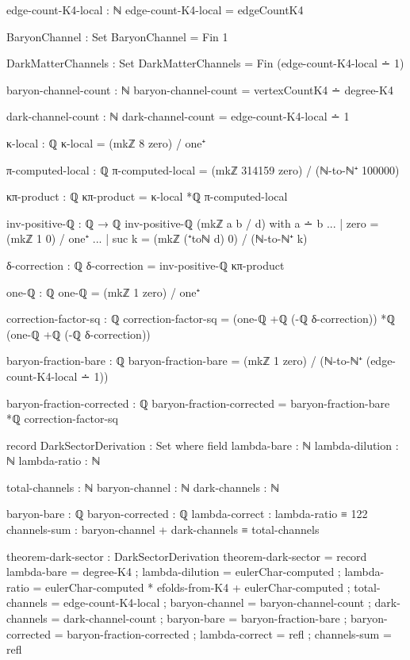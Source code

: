 \documentclass[11pt,a4paper]{book}
\begin{document}
\begin{code}
edge-count-K4-local : ℕ
edge-count-K4-local = edgeCountK4

BaryonChannel : Set
BaryonChannel = Fin 1

DarkMatterChannels : Set
DarkMatterChannels = Fin (edge-count-K4-local ∸ 1)

baryon-channel-count : ℕ
baryon-channel-count = vertexCountK4 ∸ degree-K4

dark-channel-count : ℕ
dark-channel-count = edge-count-K4-local ∸ 1
\end{code}

\begin{code}
κ-local : ℚ
κ-local = (mkℤ 8 zero) / one⁺

π-computed-local : ℚ
π-computed-local = (mkℤ 314159 zero) / (ℕ-to-ℕ⁺ 100000)

κπ-product : ℚ
κπ-product = κ-local *ℚ π-computed-local

inv-positive-ℚ : ℚ → ℚ
inv-positive-ℚ (mkℤ a b / d) with a ∸ b
... | zero = (mkℤ 1 0) / one⁺
... | suc k = (mkℤ (⁺toℕ d) 0) / (ℕ-to-ℕ⁺ k)

δ-correction : ℚ
δ-correction = inv-positive-ℚ κπ-product

one-ℚ : ℚ
one-ℚ = (mkℤ 1 zero) / one⁺

correction-factor-sq : ℚ
correction-factor-sq = (one-ℚ +ℚ (-ℚ δ-correction)) *ℚ (one-ℚ +ℚ (-ℚ δ-correction))

baryon-fraction-bare : ℚ
baryon-fraction-bare = (mkℤ 1 zero) / (ℕ-to-ℕ⁺ (edge-count-K4-local ∸ 1))

baryon-fraction-corrected : ℚ
baryon-fraction-corrected = baryon-fraction-bare *ℚ correction-factor-sq
\end{code}

\begin{code}
record DarkSectorDerivation : Set where
  field
    lambda-bare : ℕ
    lambda-dilution : ℕ
    lambda-ratio : ℕ
    
    total-channels : ℕ
    baryon-channel : ℕ
    dark-channels : ℕ
    
    baryon-bare : ℚ
    baryon-corrected : ℚ
    lambda-correct : lambda-ratio ≡ 122
    channels-sum : baryon-channel + dark-channels ≡ total-channels

theorem-dark-sector : DarkSectorDerivation
theorem-dark-sector = record
  { lambda-bare = degree-K4
  ; lambda-dilution = eulerChar-computed
  ; lambda-ratio = eulerChar-computed * efolds-from-K4 + eulerChar-computed
  ; total-channels = edge-count-K4-local
  ; baryon-channel = baryon-channel-count
  ; dark-channels = dark-channel-count
  ; baryon-bare = baryon-fraction-bare
  ; baryon-corrected = baryon-fraction-corrected
  ; lambda-correct = refl
  ; channels-sum = refl
  }
\end{code}
\end{document}
